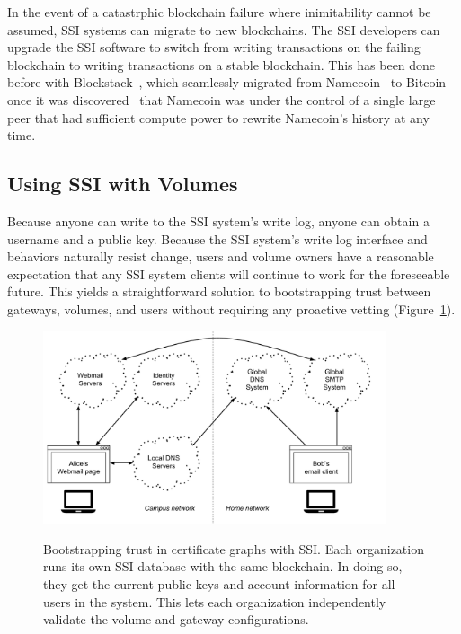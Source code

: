 In the event of a catastrphic blockchain failure where inimitability
cannot be assumed, SSI systems can migrate to new blockchains.  The SSI
developers can upgrade the SSI software to switch from writing transactions on
the failing blockchain to writing transactions on a stable blockchain.  This has
been done before with Blockstack~\cite{blockstack-namecoin-migration}, which
seamlessly migrated from Namecoin~\cite{namecoin} to Bitcoin once it was
discovered~\cite{blockstack} that Namecoin was under the control of a single
large peer that had sufficient compute power to rewrite Namecoin's history
at any time.

\subsection{Using SSI with Volumes}

Because anyone can write to the SSI system's write log, anyone can obtain a
username and a public key.  Because the SSI system's write log interface and
behaviors naturally resist change, users and volume owners have a reasonable
expectation that any SSI system clients will continue to work for the
foreseeable future.  This yields a straightforward solution to bootstrapping
trust between gateways, volumes, and users without requiring any proactive
vetting (Figure~\ref{fig:chap2-ssi-system-with-volumes}).

\begin{figure}[h]
   \caption{Bootstrapping trust in certificate graphs with SSI.  Each
   organization runs its own SSI database with the same blockchain.  In doing
   so, they get the current public keys and account information for all users in
   the system.  This lets each organization independently validate the volume
   and gateway configurations.}
   \centering
   \includegraphics[width=0.9\textwidth,page=15]{figures/dissertation-figures}
   \label{fig:chap2-ssi-system-with-volumes}
\end{figure}

